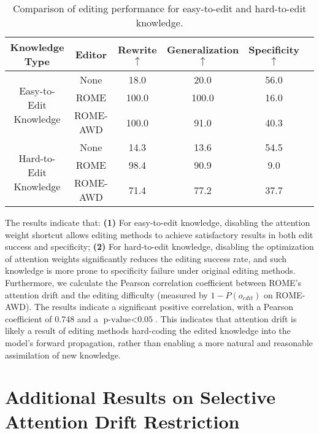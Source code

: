 \begin{table*}[!htbp]
    \centering
    \caption{Comparison of editing performance for easy-to-edit and hard-to-edit knowledge.}
    \label{tab:knowledge_editing}
    \begin{adjustbox}{width=0.8\textwidth}
    \begin{tabular}{cccccc}
    \toprule
         \textbf{Knowledge Type} & \textbf{Editor} & \textbf{Rewrite $\uparrow$} & \textbf{Generalization $\uparrow$} & \textbf{Specificity $\uparrow$} \\
    \midrule
    \multirow{3}{*}{Easy-to-Edit Knowledge} 
    & None & 18.0 & 20.0 & 56.0 \\
    & ROME & 100.0 & 100.0 & 16.0 \\
    & ROME-AWD & 100.0 & 91.0 & 40.3 \\
    \midrule
    \multirow{3}{*}{Hard-to-Edit Knowledge} 
    & None & 14.3 & 13.6 & 54.5 \\
    & ROME & 98.4 & 90.9 & 9.0 \\
    & ROME-AWD & 71.4 & 77.2 & 37.7 \\
    \bottomrule
    \end{tabular}
    \end{adjustbox}
    \label{tab:AWD}
\end{table*}

The results indicate that: \textbf{(1)} For easy-to-edit knowledge, disabling the attention weight shortcut allows editing methods to achieve satisfactory results in both edit success and specificity; \textbf{(2)} For hard-to-edit knowledge, disabling the optimization of attention weights significantly reduces the editing success rate, and such knowledge is more prone to specificity failure under original editing methods.
Furthermore, we calculate the Pearson correlation coefficient between ROME's attention drift and the editing difficulty (measured by \(1 - P(o_{edit})\) on ROME-AWD). The results indicate a significant positive correlation, with a Pearson coefficient of 0.748 and a $\text{p-value} < \text{0.05}$.
This indicates that attention drift is likely a result of editing methods hard-coding the edited knowledge into the model’s forward propagation, rather than enabling a more natural and reasonable assimilation of new knowledge.




\section{Additional Results on Selective Attention Drift Restriction}
\label{app:add_result}

